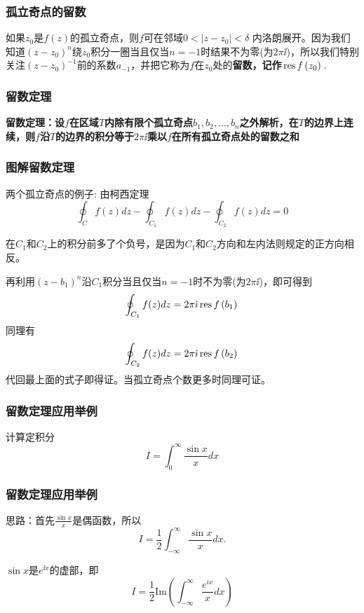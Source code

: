 \documentclass[CJK]{beamer}
\begin{document}
\begin{frame}
  \frametitle{孤立奇点的留数}
  
  如果$z_0$是$f(z)$的孤立奇点，则$f$可在邻域$0<|z-z_0|<\delta$ 内洛朗展开。因为我们知道$(z-z_0)^n$绕$z_0$积分一圈当且仅当$n= -1$时结果不为零(为$2 \pi\ii$)，所以我们特别关注$(z-z_0)^{-1}$前的系数$a_{-1}$，并把它称为$f$在$z_0$处的{\bf 留数，记作$\,\mathrm{res}\,f\left(z_0\right)\,$}.
  
\end{frame}


\begin{frame}
  \frametitle{留数定理}
  
      {\blue \bf 留数定理：设$f$在区域$T$内除有限个孤立奇点$b_1,b_2,\ldots,b_n$之外解析，在$T$的边界上连续，则$f$沿$T$的边界的积分等于$2\pi\ii$乘以$f$在所有孤立奇点处的留数之和}


  
\end{frame}

\begin{frame}
  \frametitle{图解留数定理}
  
  两个孤立奇点的例子: 由柯西定理
  $$\oint_C f(z) dz - \oint_{C_1}f(z)dz - \oint_{C_2}f(z) dz = 0$$
  \emini
  \emini

    {\scriptsize 在$C_1$和$C_2$上的积分前多了个负号，是因为$C_1$和$C_2$方向和左内法则规定的正方向相反。}  

  再利用$(z-b_1)^n$沿$C_1$积分当且仅当$n=-1$时不为零(为$2\pi\ii$)，即可得到
  $$\oint_{C_1}f(z)dz = 2\pi{\dot{\imath}} \,\mathrm{res}\,f\left(b_1\right)\,$$
  同理有
  $$\oint_{C_2}f(z)dz = 2\pi{\dot{\imath}} \,\mathrm{res}\,f\left(b_2\right)\,$$
  代回最上面的式子即得证。当孤立奇点个数更多时同理可证。 
  
\end{frame}

\begin{frame}
  \frametitle{留数定理应用举例}
  
  计算定积分
  $$I = \int_0^\infty \frac{\sin x}{x} dx $$
  
\end{frame}

\begin{frame}
  \frametitle{留数定理应用举例}
  
  思路：首先$\frac{\sin x}{x}$是偶函数，所以
  $$I = \frac{1}{2} \int_{-\infty}^\infty \frac{\sin x}{x} dx. $$

  $\sin x$是$e^{\ii x}$的虚部，即
  $$I = \frac{1}{2}\mathrm{Im} \left(\int_{-\infty}^\infty \frac{e^{ix}}{x} dx \right)$$
  
\end{frame}
\end{document}
